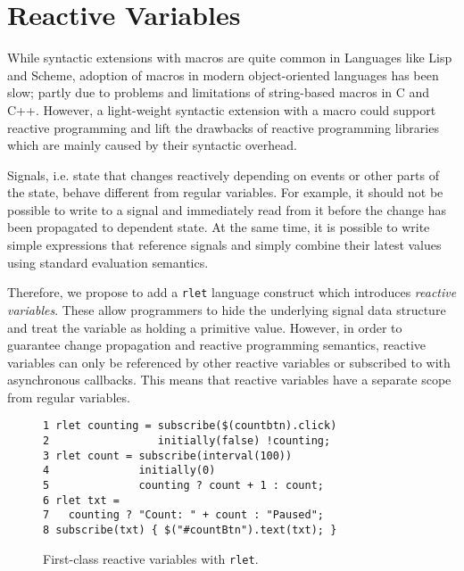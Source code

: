 \documentclass{sig-alternate-05-2015}
\begin{document}
\section{Reactive Variables}

While syntactic extensions with macros are quite common in Languages like Lisp and Scheme, adoption of macros in modern object-oriented languages has been slow; partly due to problems and limitations of string-based macros in C and C++.  However, a light-weight syntactic extension with a macro could support reactive programming and lift the drawbacks of reactive programming libraries which are mainly caused by their syntactic overhead.

Signals, i.e. state that changes reactively depending on events or other parts of the state, behave different from regular variables.  For example, it should not be possible to write to a signal and immediately read from it before the change has been propagated to dependent state.  At the same time, it is possible to write simple expressions that reference signals and simply combine their latest values using standard evaluation semantics.

Therefore, we propose to add a \lstinline+rlet+ language construct which introduces \emph{reactive variables}.  These allow programmers to hide the underlying signal data structure and treat the variable as holding a primitive value.  However, in order to guarantee change propagation and reactive programming semantics, reactive variables can only be referenced by other reactive variables or subscribed to with asynchronous callbacks.  This means that reactive variables have a separate scope from regular variables.


\begin{figure}
\begin{lstlisting}
1 rlet counting = subscribe($(countbtn).click)
2                 initially(false) !counting;
3 rlet count = subscribe(interval(100))
4              initially(0)
5              counting ? count + 1 : count;
6 rlet txt =
7   counting ? "Count: " + count : "Paused";
8 subscribe(txt) { $("#countBtn").text(txt); }\end{lstlisting}
\caption{First-class reactive variables with \texttt{rlet}.}
\label{lst:rlet}
\end{figure}
\end{document}
